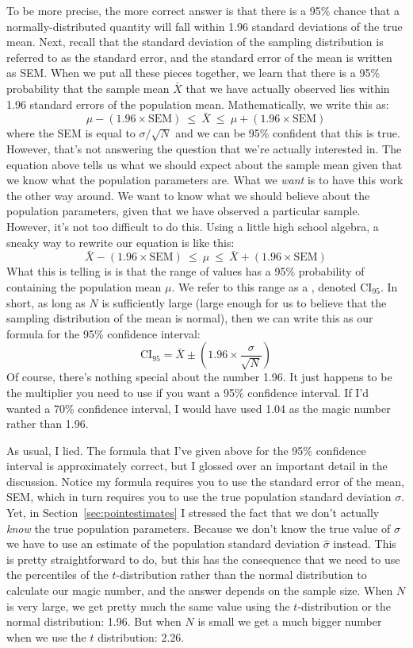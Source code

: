 To be more precise, the more correct answer is that there is a 95\% chance that a normally-distributed quantity will fall within 1.96 standard deviations of the true mean. Next, recall that the standard deviation of the sampling distribution is referred to as the standard error, and the standard error of the mean is written as SEM. When we put all these pieces together, we learn that there is a 95\% probability that the sample mean $\bar{X}$ that we have actually observed lies within 1.96 standard errors of the population mean. Mathematically, we write this as:
$$
\mu - \left( 1.96 \times \mbox{SEM} \right) \ \leq \  \bar{X}\  \leq \  \mu + \left( 1.96 \times \mbox{SEM} \right) 
$$
where the SEM is equal to $\sigma / \sqrt{N}$ and we can be 95\% confident that this is true. However, that's not answering the question that we're actually interested in. The equation above tells us what we should expect about the sample mean given that we know what the population parameters are. What we {\it want} is to have this work the other way around. We want to know what we should believe about the population parameters, given that we have observed a particular sample. However, it's not too difficult to do this. Using a little high school algebra, a sneaky way to rewrite our equation is like this:
$$
\bar{X} -  \left( 1.96 \times \mbox{SEM} \right) \ \leq \ \mu  \ \leq  \ \bar{X} +  \left( 1.96 \times \mbox{SEM}\right)
$$
What this is telling is is that the range of values has a 95\% probability of containing the population mean $\mu$. We refer to this range as a , denoted $\mbox{CI}_{95}$. In short, as long as $N$ is sufficiently large (large enough for us to believe that the sampling distribution of the mean is normal), then we can write this as our formula for the 95\% confidence interval:
$$
\mbox{CI}_{95} = \bar{X} \pm \left( 1.96 \times \frac{\sigma}{\sqrt{N}} \right)
$$
Of course, there's nothing special about the number 1.96. It just happens to be the multiplier you need to use if you want a 95\% confidence interval. If I'd wanted a 70\% confidence interval, I would have used 1.04 as the magic number rather than 1.96.


As usual, I lied. The formula that I've given above for the 95\% confidence interval is approximately correct, but I glossed over an important detail in the discussion. Notice my formula requires you to use the standard error of the mean, SEM, which in turn requires you to use the true population standard deviation $\sigma$. Yet, in Section~\ref{sec:pointestimates} I stressed the fact that we don't actually {\it know} the true population parameters. Because we don't know the true value of $\sigma$ we have to use an estimate of the population standard deviation $\hat{\sigma}$ instead. This is pretty straightforward to do, but this has the consequence that we need to use the percentiles of the $t$-distribution rather than the normal distribution to calculate our magic number, and the answer depends on the sample size. When $N$ is very large, we get pretty much the same value using the $t$-distribution or the normal distribution: 1.96. But when $N$ is small we get a much bigger number when we use the $t$ distribution: 2.26.

